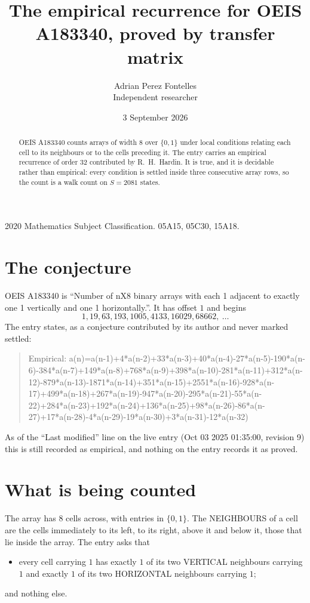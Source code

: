 \documentclass[11pt,a4paper]{article}
\title{The empirical recurrence for OEIS A183340, proved by transfer matrix}
\author{Adrian Perez Fontelles\\ \small Independent researcher}
\date{3 September 2026}
\theoremstyle{plain}
\theoremstyle{definition}
\begin{document}
\maketitle

\begin{abstract}
OEIS A183340 counts arrays of width $8$ over $\{0,1\}$ under local conditions relating each cell
to its neighbours or to the cells preceding it. The entry carries an empirical recurrence of
order $32$ contributed by R.~H.~Hardin. It is true, and it is decidable rather than
empirical: every condition is settled inside three consecutive array rows, so the count is a
walk count on $S=2081$ states.
\end{abstract}

\noindent\small 2020 Mathematics Subject Classification. 05A15, 05C30, 15A18.\normalsize

\section{The conjecture}

OEIS A183340 is ``Number of nX8 binary arrays with each 1 adjacent to exactly one 1 vertically and one 1 horizontally.''. It has offset $1$ and begins
\[
1, 19, 63, 193, 1005, 4133, 16029, 68662,\ \dots
\]
The entry states, as a conjecture contributed by its author and never marked settled:
\begin{quote}
Empirical: a(n)=a(n-1)+4*a(n-2)+33*a(n-3)+40*a(n-4)-27*a(n-5)-190*a(n-6)-384*a(n-7)+149*a(n-8)+768*a(n-9)+398*a(n-10)-281*a(n-11)+312*a(n-12)-879*a(n-13)-1871*a(n-14)+351*a(n-15)+2551*a(n-16)-928*a(n-17)+499*a(n-18)+267*a(n-19)-947*a(n-20)-295*a(n-21)-55*a(n-22)+284*a(n-23)+192*a(n-24)+136*a(n-25)+98*a(n-26)-86*a(n-27)+17*a(n-28)-4*a(n-29)-19*a(n-30)+3*a(n-31)-12*a(n-32)
\end{quote}
As of the ``Last modified'' line on the live entry (Oct 03 2025 01:35:00, revision 9) this is still
recorded as empirical, and nothing on the entry records it as proved.

\section{What is being counted}

The array has $8$ cells across, with entries in $\{0,1\}$. The NEIGHBOURS of a cell are the
cells immediately to its left, to its right, above it and below it, those that lie inside the
array. The entry asks that
\begin{itemize}
\item every cell carrying $1$ has exactly $1$ of its two VERTICAL neighbours carrying $1$ and exactly $1$ of its two HORIZONTAL neighbours carrying $1$;
\end{itemize}
and nothing else.
\end{document}
